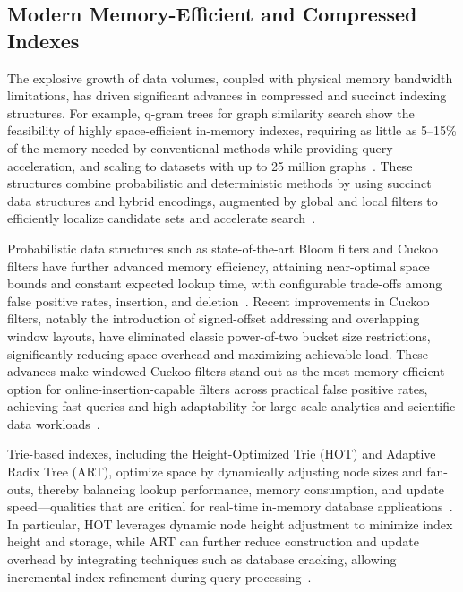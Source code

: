 \documentclass[sigconf]{acmart}
\begin{document}
\subsection{Modern Memory-Efficient and Compressed Indexes}

The explosive growth of data volumes, coupled with physical memory bandwidth limitations, has driven significant advances in compressed and succinct indexing structures. For example, q-gram trees for graph similarity search show the feasibility of highly space-efficient in-memory indexes, requiring as little as 5--15\% of the memory needed by conventional methods while providing query acceleration, and scaling to datasets with up to 25 million graphs~\cite{ref106}. These structures combine probabilistic and deterministic methods by using succinct data structures and hybrid encodings, augmented by global and local filters to efficiently localize candidate sets and accelerate search~\cite{ref106}.

Probabilistic data structures such as state-of-the-art Bloom filters and Cuckoo filters have further advanced memory efficiency, attaining near-optimal space bounds and constant expected lookup time, with configurable trade-offs among false positive rates, insertion, and deletion~\cite{ref81,ref82,ref87}. Recent improvements in Cuckoo filters, notably the introduction of signed-offset addressing and overlapping window layouts, have eliminated classic power-of-two bucket size restrictions, significantly reducing space overhead and maximizing achievable load. These advances make windowed Cuckoo filters stand out as the most memory-efficient option for online-insertion-capable filters across practical false positive rates, achieving fast queries and high adaptability for large-scale analytics and scientific data workloads~\cite{ref87}.

Trie-based indexes, including the Height-Optimized Trie (HOT) and Adaptive Radix Tree (ART), optimize space by dynamically adjusting node sizes and fan-outs, thereby balancing lookup performance, memory consumption, and update speed—qualities that are critical for real-time in-memory database applications~\cite{ref108,ref109}. In particular, HOT leverages dynamic node height adjustment to minimize index height and storage, while ART can further reduce construction and update overhead by integrating techniques such as database cracking, allowing incremental index refinement during query processing~\cite{ref108,ref109}.
\end{document}
